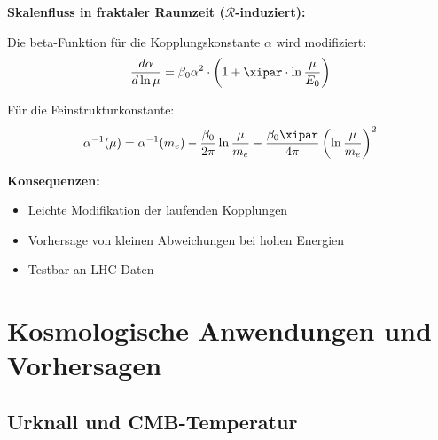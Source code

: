 	\begin{beziehung}
		\textbf{Skalenfluss in fraktaler Raumzeit ($\mathcal{R}$-induziert):}
		
		Die beta-Funktion für die Kopplungskonstante $\alpha$ wird modifiziert:
		\begin{equation}
			\frac{d\alpha}{d\ln\mu} = \beta_0 \alpha^2 \cdot \left(1 + \xipar \cdot \ln\frac{\mu}{E_0}\right)
		\end{equation}
		
		Für die Feinstrukturkonstante:
		\begin{equation}
			\alpha^{-1}(\mu) = \alpha^{-1}(m_e) - \frac{\beta_0}{2\pi} \ln\frac{\mu}{m_e} - \frac{\beta_0 \xipar}{4\pi} \left(\ln\frac{\mu}{m_e}\right)^2
		\end{equation}
		
		\textbf{Konsequenzen:}
		\begin{itemize}
			\item Leichte Modifikation der laufenden Kopplungen
			\item Vorhersage von kleinen Abweichungen bei hohen Energien
			\item Testbar an LHC-Daten
		\end{itemize}
	\end{beziehung}
	
	\section{Kosmologische Anwendungen und Vorhersagen}
	
	\subsection{Urknall und CMB-Temperatur}
	
